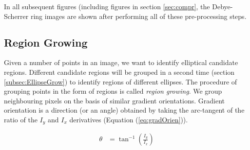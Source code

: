\documentclass[preprint]{iucr}              %
\newcommand\dsr{Debye-Scherrer ring}
\begin{document}
In all subsequent figures (including figures in section \ref{sec:compr}, the
{\dsr} images are shown after performing all of these pre-processing steps. 

\subsection{Region Growing} \label{regGrow}
Given a number of points in an image, we want to identify elliptical candidate
regions. 
Different candidate regions will be grouped in a second time (section
\ref{subsec:EllipseGrow}) to identify regions of different ellipses. 
The procedure of grouping points in the form of regions is called \textit{region
growing}. 
We group neighbouring pixels on the basis of similar gradient orientations.
Gradient orientation is a direction (or an angle) obtained by taking the
arc-tangent of the ratio of the $I_y$ and $I_x$ derivatives (Equation
(\ref{eq:gradOrien})).  

\begin{align} \label{eq:gradOrien}
\theta& =\tan^{-1}\left(\frac{I_y}{I_x}\right)
\end{align}
\end{document}
